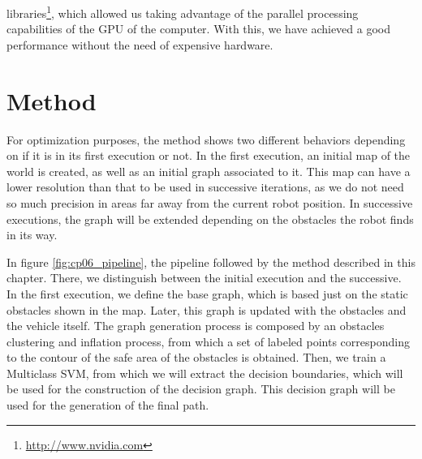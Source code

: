  libraries\footnote{\url{http://www.nvidia.com}}, which allowed us taking advantage of the parallel processing capabilities of the \ac{GPU} of the computer. With this, we have achieved a good performance without the need of expensive hardware.

\section{Method}\label{ch:chapter06_01}

For optimization purposes, the method shows two different behaviors depending on if it is in its first execution or not. In the first execution, an initial map of the world is created, as well as an initial graph associated to it. This map can have a lower resolution than that to be used in successive iterations, as we do not need so much precision in areas far away from the current robot position. In successive executions, the graph will be extended depending on the obstacles the robot finds in its way.

In figure \ref{fig:cp06_pipeline}, the pipeline followed by the method described in this chapter. There, we distinguish between the initial execution and the successive. In the first execution, we define the base graph, which is based just on the static obstacles shown in the map. Later, this graph is updated with the obstacles and the vehicle itself. The graph generation process is composed by an obstacles clustering and inflation process, from which a set of labeled points corresponding to the contour of the safe area of the obstacles is obtained. Then, we train a Multiclass \ac{SVM}, from which we will extract the decision boundaries, which will be used for the construction of the decision graph. This decision graph will be used for the generation of the final path.

